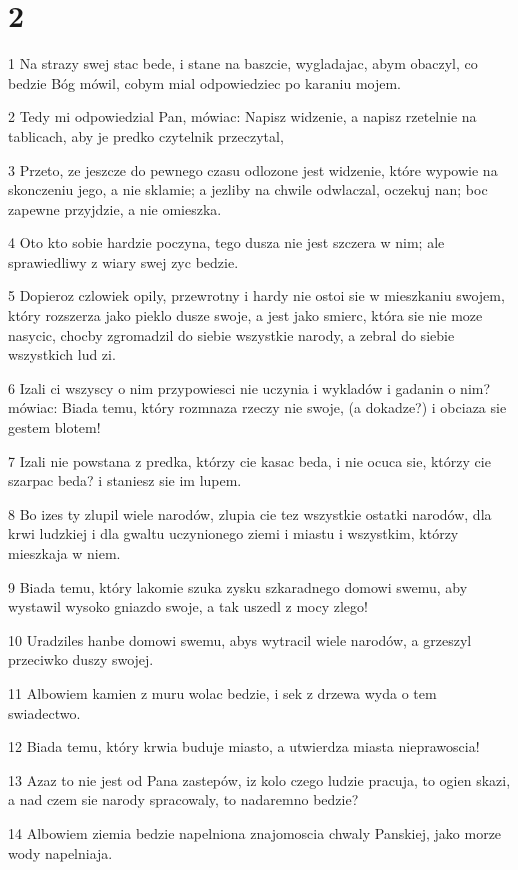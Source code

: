 \chapter{2}

\par 1 Na strazy swej stac bede, i stane na baszcie, wygladajac, abym obaczyl, co bedzie Bóg mówil, cobym mial odpowiedziec po karaniu mojem.
\par 2 Tedy mi odpowiedzial Pan, mówiac: Napisz widzenie, a napisz rzetelnie na tablicach, aby je predko czytelnik przeczytal,
\par 3 Przeto, ze jeszcze do pewnego czasu odlozone jest widzenie, które wypowie na skonczeniu jego, a nie sklamie; a jezliby na chwile odwlaczal, oczekuj nan; boc zapewne przyjdzie, a nie omieszka.
\par 4 Oto kto sobie hardzie poczyna, tego dusza nie jest szczera w nim; ale sprawiedliwy z wiary swej zyc bedzie.
\par 5 Dopieroz czlowiek opily, przewrotny i hardy nie ostoi sie w mieszkaniu swojem, który rozszerza jako pieklo dusze swoje, a jest jako smierc, która sie nie moze nasycic, chocby zgromadzil do siebie wszystkie narody, a zebral do siebie wszystkich lud zi.
\par 6 Izali ci wszyscy o nim przypowiesci nie uczynia i wykladów i gadanin o nim? mówiac: Biada temu, który rozmnaza rzeczy nie swoje, (a dokadze?) i obciaza sie gestem blotem!
\par 7 Izali nie powstana z predka, którzy cie kasac beda, i nie ocuca sie, którzy cie szarpac beda? i staniesz sie im lupem.
\par 8 Bo izes ty zlupil wiele narodów, zlupia cie tez wszystkie ostatki narodów, dla krwi ludzkiej i dla gwaltu uczynionego ziemi i miastu i wszystkim, którzy mieszkaja w niem.
\par 9 Biada temu, który lakomie szuka zysku szkaradnego domowi swemu, aby wystawil wysoko gniazdo swoje, a tak uszedl z mocy zlego!
\par 10 Uradziles hanbe domowi swemu, abys wytracil wiele narodów, a grzeszyl przeciwko duszy swojej.
\par 11 Albowiem kamien z muru wolac bedzie, i sek z drzewa wyda o tem swiadectwo.
\par 12 Biada temu, który krwia buduje miasto, a utwierdza miasta nieprawoscia!
\par 13 Azaz to nie jest od Pana zastepów, iz kolo czego ludzie pracuja, to ogien skazi, a nad czem sie narody spracowaly, to nadaremno bedzie?
\par 14 Albowiem ziemia bedzie napelniona znajomoscia chwaly Panskiej, jako morze wody napelniaja.

